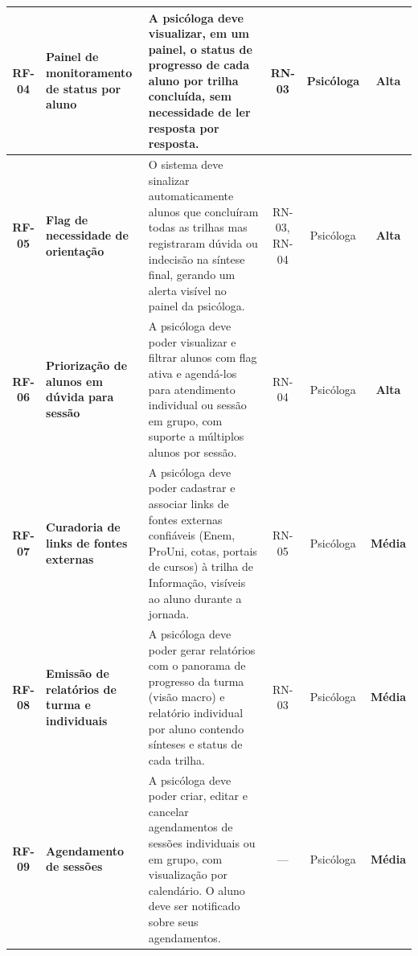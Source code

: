 {\begin{longtable}{|c|p{2.5cm}|p{4.5cm}|c|c|c|}
    \textcolor{blue!70!black}{\textbf{RF-04}} & 
    \textbf{Painel de monitoramento de status por aluno} & 
    A psicóloga deve visualizar, em um painel, o status de progresso de cada aluno por trilha concluída, sem necessidade de ler resposta por resposta. & 
    RN-03 & 
    Psicóloga & 
    \textcolor{red!80!black}{\textbf{Alta}} \\
    \hline
    
    \textcolor{blue!70!black}{\textbf{RF-05}} & 
    \textbf{Flag de necessidade de orientação} & 
    O sistema deve sinalizar automaticamente alunos que concluíram todas as trilhas mas registraram dúvida ou indecisão na síntese final, gerando um alerta visível no painel da psicóloga. & 
    RN-03, RN-04 & 
    Psicóloga & 
    \textcolor{red!80!black}{\textbf{Alta}} \\
    \hline

    \textcolor{blue!70!black}{\textbf{RF-06}} & 
    \textbf{Priorização de alunos em dúvida para sessão} & 
    A psicóloga deve poder visualizar e filtrar alunos com flag ativa e agendá-los para atendimento individual ou sessão em grupo, com suporte a múltiplos alunos por sessão. & 
    RN-04 & 
    Psicóloga & 
    \textcolor{red!80!black}{\textbf{Alta}} \\
    \hline

    \textcolor{blue!70!black}{\textbf{RF-07}} & 
    \textbf{Curadoria de links de fontes externas} & 
    A psicóloga deve poder cadastrar e associar links de fontes externas confiáveis (Enem, ProUni, cotas, portais de cursos) à trilha de Informação, visíveis ao aluno durante a jornada. & 
    RN-05 & 
    Psicóloga & 
    \textcolor{orange!80!black}{\textbf{Média}} \\
    \hline

    \textcolor{blue!70!black}{\textbf{RF-08}} & 
    \textbf{Emissão de relatórios de turma e individuais} & 
    A psicóloga deve poder gerar relatórios com o panorama de progresso da turma (visão macro) e relatório individual por aluno contendo sínteses e status de cada trilha. & 
    RN-03 & 
    Psicóloga & 
    \textcolor{orange!80!black}{\textbf{Média}} \\
    \hline

    \textcolor{blue!70!black}{\textbf{RF-09}} & 
    \textbf{Agendamento de sessões} & 
    A psicóloga deve poder criar, editar e cancelar agendamentos de sessões individuais ou em grupo, com visualização por calendário. O aluno deve ser notificado sobre seus agendamentos. & 
    --- & 
    Psicóloga & 
    \textcolor{orange!80!black}{\textbf{Média}} \\
    \hline


\end{longtable}}
